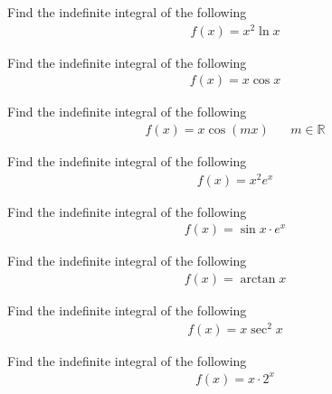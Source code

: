 \begin{exercise}
Find the indefinite integral of the following
\begin{align*}
    f(x) = x^{2} \ln x
\end{align*}
\end{exercise}

\begin{exercise}
Find the indefinite integral of the following
\begin{align*}
    f(x) = x \cos x
\end{align*}
\end{exercise}

\begin{exercise}
Find the indefinite integral of the following
\begin{align*}
    f(x) = x \cos(mx) \hspace{20pt} m \in \mathbb{R}
\end{align*}
\end{exercise}

\begin{exercise}
Find the indefinite integral of the following
\begin{align*}
    f(x) = x^{2} e^{x}
\end{align*}
\end{exercise}

\begin{exercise}
Find the indefinite integral of the following
\begin{align*}
    f(x) = \sin x \cdot e^{x}
\end{align*}
\end{exercise}

\begin{exercise}
Find the indefinite integral of the following
\begin{align*}
    f(x) = \arctan x
\end{align*}
\end{exercise}

\begin{exercise}
Find the indefinite integral of the following
\begin{align*}
    f(x) = x \sec^{2} x
\end{align*}
\end{exercise}

\begin{exercise}
Find the indefinite integral of the following
\begin{align*}
    f(x) = x \cdot 2^{x}
\end{align*}
\end{exercise}

